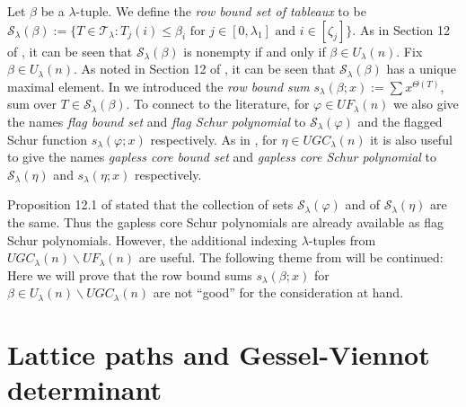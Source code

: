 \documentclass[11pt]{article}
\theoremstyle{definition}
\theoremstyle{remark}
\numberwithin{equation}{section}
\begin{document}
\begin{spacing}{1.35}
Let $\beta$ be a $\lambda$-tuple.  We define the \emph{row bound set of tableaux} to be $\mathcal{S}_\lambda(\beta) := \{ T \in \mathcal{T}_\lambda : T_j(i) \leq \beta_i \text{ for } j \in [0, \lambda_1] \text{ and } i \in [\zeta_j] \}$.  As in Section 12 of \cite{PW}, it can be seen that $\mathcal{S}_\lambda(\beta)$ is nonempty if and only if $\beta \in U_\lambda(n)$.  Fix $\beta \in U_\lambda(n)$.  As noted in Section 12 of \cite{PW}, it can be seen that $\mathcal{S}_\lambda(\beta)$ has a unique maximal element.  In \cite{PW} we introduced the \emph{row bound sum} $s_\lambda(\beta; x) := \sum x^{\Theta(T)}$, sum over $T \in \mathcal{S}_\lambda(\beta)$.  To connect to the literature, for $\varphi \in UF_\lambda(n)$ we also give the names \emph{flag bound set} and \emph{flag Schur polynomial} to $\mathcal{S}_\lambda(\varphi)$ and the flagged Schur function $s_\lambda(\varphi;x)$ respectively.  As in \cite{PW}, for $\eta \in UGC_\lambda(n)$ it is also useful to give the names \emph{gapless core bound set} and \emph{gapless core Schur polynomial} to $\mathcal{S}_\lambda(\eta)$ and $s_\lambda(\eta;x)$ respectively.



Proposition 12.1 of \cite{PW} stated that the collection of sets $\mathcal{S}_\lambda(\varphi)$ and of $\mathcal{S}_\lambda(\eta)$ are the same.  Thus the gapless core Schur polynomials are already available as flag Schur polynomials.  However, the additional indexing $\lambda$-tuples from $UGC_\lambda(n) \backslash UF_\lambda(n)$ are useful.  The following theme from \cite{PW} will be continued:  Here we will prove that the row bound sums  $s_\lambda(\beta;x)$ for $\beta \in U_\lambda(n) \backslash UGC_\lambda(n)$ are not ``good'' for the consideration at hand.










\section{Lattice paths and Gessel-Viennot determinant}


\end{spacing}
\end{document}
